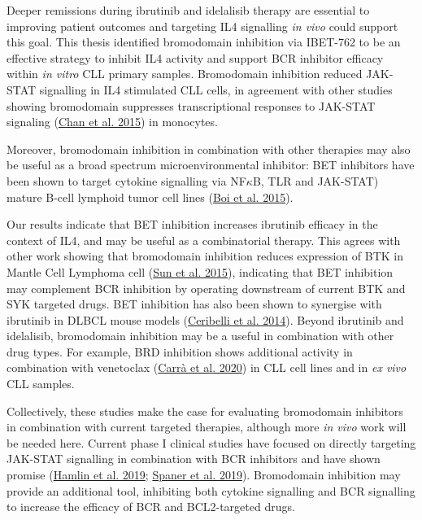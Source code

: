 \documentclass[11pt, a4paper, twosided]{book}
\begin{document}
Deeper remissions during ibrutinib and idelalisib therapy are essential to improving patient outcomes and targeting IL4 signalling \emph{in vivo} could support this goal. This thesis identified bromodomain inhibition via IBET-762 to be an effective strategy to inhibit IL4 activity and support BCR inhibitor efficacy within \emph{in vitro} CLL primary samples. Bromodomain inhibition reduced JAK-STAT signalling in IL4 stimulated CLL cells, in agreement with other studies showing bromodomain suppresses transcriptional responses to JAK-STAT signaling (\protect\hyperlink{ref-Chan2015}{Chan et al. 2015}) in monocytes.

Moreover, bromodomain inhibition in combination with other therapies may also be useful as a broad spectrum microenvironmental inhibitor: BET inhibitors have been shown to target cytokine signalling via NF\(\kappa\)B, TLR and JAK-STAT) mature B-cell lymphoid tumor cell lines (\protect\hyperlink{ref-Boi2015}{Boi et al. 2015}).

Our results indicate that BET inhibition increases ibrutinib efficacy in the context of IL4, and may be useful as a combinatorial therapy. This agrees with other work showing that bromodomain inhibition reduces expression of BTK in Mantle Cell Lymphoma cell (\protect\hyperlink{ref-Sun2015}{Sun et al. 2015}), indicating that BET inhibition may complement BCR inhibition by operating downstream of current BTK and SYK targeted drugs. BET inhibition has also been shown to synergise with ibrutinib in DLBCL mouse models (\protect\hyperlink{ref-Ceribelli2014}{Ceribelli et al. 2014}). Beyond ibrutinib and idelalisib, bromodomain inhibition may be a useful in combination with other drug types. For example, BRD inhibition shows additional activity in combination with venetoclax (\protect\hyperlink{ref-Carra2019}{Carrà et al. 2020}) in CLL cell lines and in \emph{ex vivo} CLL samples.

Collectively, these studies make the case for evaluating bromodomain inhibitors in combination with current targeted therapies, although more \emph{in vivo} work will be needed here. Current phase I clinical studies have focused on directly targeting JAK-STAT signalling in combination with BCR inhibitors and have shown promise (\protect\hyperlink{ref-Hamlin2019}{Hamlin et al. 2019}; \protect\hyperlink{ref-Spaner2019}{Spaner et al. 2019}). Bromodomain inhibition may provide an additional tool, inhibiting both cytokine signalling and BCR signalling to increase the efficacy of BCR and BCL2-targeted drugs.
\end{document}

